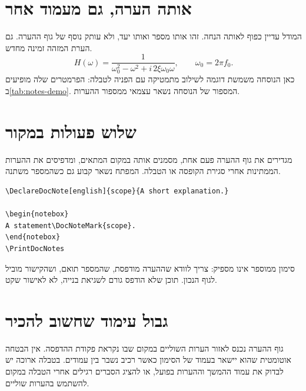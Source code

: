 \section{אותה הערה, גם מעמוד אחר}
המודל עדיין כפוף לאותה הנחה. זהו אותו מספר ואותו יעד,
ולא עותק נוסף של גוף ההערה. גם הערת המזהה זמינה מחדש.
\begin{equation}\label{eq:response}
H(\omega)=\frac{1}{\omega_0^2-\omega^2+i\,2\xi\omega_0\omega},
\qquad \omega_0=2\pi f_0.
\end{equation}
כאן הנוסחה משמשת דוגמה לשילוב מתמטיקה עם הפניה לטבלה: הפרמטרים שלה מופיעים
ב\autoref{tab:notes-demo}. המספור של הנוסחה נשאר עצמאי ממספור ההערות.
\section{שלוש פעולות במקור}
מגדירים את גוף ההערה פעם אחת, מסמנים אותה במקום המתאים, ומדפיסים את ההערות
הממתינות אחרי סגירת הקופסה או הטבלה. המפתח נשאר קבוע גם כשהמספר משתנה.
\begin{asmblock}
\begin{lstlisting}[basicstyle=\small\ttfamily,numbers=none]
\DeclareDocNote[english]{scope}{A short explanation.}

\begin{notebox}
A statement\DocNoteMark{scope}.
\end{notebox}
\PrintDocNotes
\end{lstlisting}
\end{asmblock}
\begin{keybox}[frametitle={בדיקה לפני מסירה}]
סימון ממוספר אינו מספיק: צריך לוודא שההערה מודפסת, שהמספר תואם,
ושהקישור מוביל לגוף הנכון. תוכן שלא הודפס גורם לשגיאת בנייה, לא לאישור שקט.
\end{keybox}
\section{גבול עימוד שחשוב להכיר}
גוף ההערה נכנס לאזור הערות השוליים במקום שבו נקראת פקודת ההדפסה.
אין הבטחה אוטומטית שהוא יישאר בעמוד של הסימון כאשר רכיב נשבר בין עמודים.
בטבלה ארוכה יש לבדוק את עמוד ההמשך וההערות בפועל, או להציג הסברים רגילים
אחרי הטבלה במקום להשתמש בהערות שוליים.

